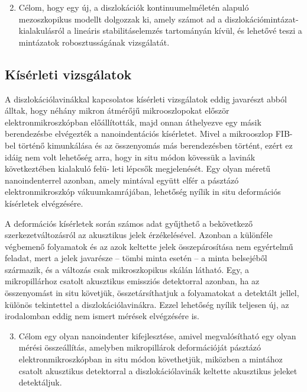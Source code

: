 \documentclass[a5paper,twoside,10pt]{article}
\begin{document}
\begin{enumerate}
\setcounter{enumi}{1}
\item Célom, hogy egy új, a diszlokációk kontinuumelméletén alapuló mezoszkopikus modellt dolgozzak ki, amely számot ad a diszlokációmintázat-kialakulásról a lineáris stabilitáselemzés tartományán kívül, és lehetővé teszi a mintázatok robosztusságának vizsgálatát.
\end{enumerate}

\subsection*{Kísérleti vizsgálatok}
A diszlokációlavinákkal kapcsolatos kísérleti vizsgálatok eddig javarészt abból álltak, hogy néhány mikron átmérőjű mikrooszlopokat először elektronmikroszkópban előállították, majd onnan áthelyezve egy másik berendezésbe elvégezték a nanoindentációs kísérletet. Mivel a mikrooszlop FIB-bel történő kimunkálása és az összenyomás más berendezésben történt, ezért ez idáig nem volt lehetőség arra, hogy in situ módon kövessük a lavinák következtében kialakuló felü- leti lépcsők megjelenését. Egy olyan méretű nanoindenterrel azonban, amely mintával együtt elfér a pásztázó elektronmikroszkóp \mbox{vákuumkamrájában}, lehetőség nyílik in situ deformációs kísérletek elvégzésére.

A deformációs kísérletek során számos adat gyűjthető a bekövetkező szerkezetváltozásról az akusztikus jelek érzékelésével. Azonban a különféle végbemenő folyamatok és az azok keltette jelek összepárosítása nem egyértelmű feladat, mert a jelek javarésze -- tömbi minta esetén -- a minta belsejéből származik, és a változás csak mikroszkopikus skálán látható. Egy, a mikropillárhoz csatolt akusztikus emissziós detektorral azonban, ha az összenyomást in situ követjük, összetársíthatjuk a folyamatokat a detektált jellel, különös tekintettel a diszlokációlavinákra. Ezzel lehetőség nyílik teljesen új, az irodalomban eddig nem ismert mérések elvégzésére is. 

\begin{enumerate}
\setcounter{enumi}{2}
\item Célom egy olyan nanoindenter kifejlesztése, amivel megvalósítható egy olyan mérési összeállítás, amelyben mikropillárok deformációját pásztázó elektronmikroszkópban in situ módon követhetjük, miközben a mintához csatolt akusztikus detektorral a diszlokációlavinák keltette akusztikus jeleket detektáljuk.
\end{enumerate}
\end{document}
